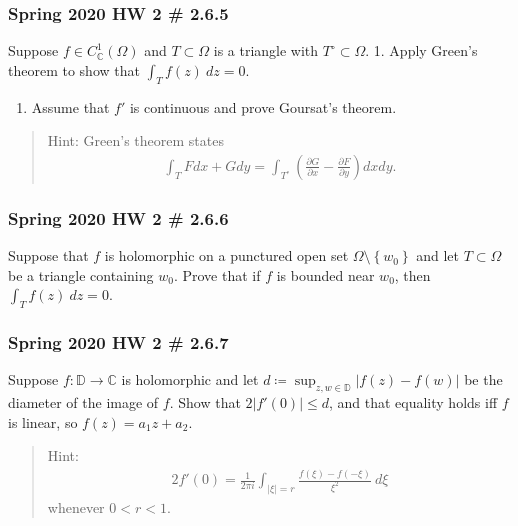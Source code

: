 \hypertarget{spring-2020-hw-2-2.6.5}{%
\subsubsection{Spring 2020 HW 2 \# 2.6.5}\label{spring-2020-hw-2-2.6.5}}

Suppose \(f\in C_{\mathbb{C}}^1(\Omega)\) and \(T\subset \Omega\) is a
triangle with \(T^\circ \subset \Omega\). 1. Apply Green's theorem to
show that \(\int_T f(z) ~dz = 0\).

\begin{enumerate}
\def\labelenumi{\arabic{enumi}.}
\setcounter{enumi}{1}
\tightlist
\item
  Assume that \(f'\) is continuous and prove Goursat's theorem.
\end{enumerate}

\begin{quote}
Hint: Green's theorem states
\begin{align*}
\int_{T} F d x+G d y=\int_{T^\circ}\left(\frac{\partial G}{\partial x}-\frac{\partial F}{\partial y}\right) d x d y
.\end{align*}
\end{quote}

\hypertarget{spring-2020-hw-2-2.6.6}{%
\subsubsection{Spring 2020 HW 2 \# 2.6.6}\label{spring-2020-hw-2-2.6.6}}

Suppose that \(f\) is holomorphic on a punctured open set
\(\Omega\setminus\left\{{w_0}\right\}\) and let \(T\subset \Omega\) be a
triangle containing \(w_0\). Prove that if \(f\) is bounded near
\(w_0\), then \(\int_T f(z) ~dz = 0\).

\hypertarget{spring-2020-hw-2-2.6.7}{%
\subsubsection{Spring 2020 HW 2 \# 2.6.7}\label{spring-2020-hw-2-2.6.7}}

Suppose \(f: {\mathbb{D}}\to {\mathbb{C}}\) is holomorphic and let
\(d \coloneqq\sup_{z, w\in {\mathbb{D}}}{\left\lvert {f(z) - f(w)} \right\rvert}\)
be the diameter of the image of \(f\). Show that
\(2 {\left\lvert {f'(0)} \right\rvert} \leq d\), and that equality holds
iff \(f\) is linear, so \(f(z) = a_1 z + a_2\).

\begin{quote}
Hint:
\begin{align*}
2f'(0) = \frac{1}{2\pi i} \int_{{\left\lvert {\xi } \right\rvert}= r} \frac{ f(\xi) - f(-\xi)  }{\xi^2} ~d\xi
\end{align*}
whenever \(0<r<1\).
\end{quote}

